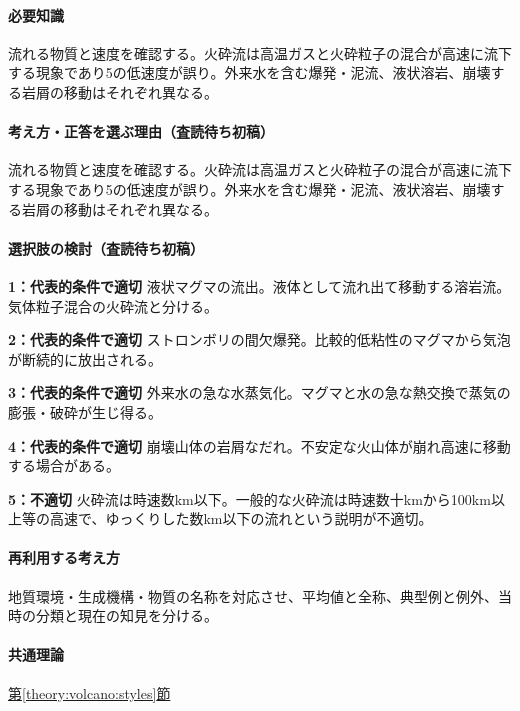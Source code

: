 \paragraph{必要知識} 流れる物質と速度を確認する。火砕流は高温ガスと火砕粒子の混合が高速に流下する現象であり5の低速度が誤り。外来水を含む爆発・泥流、液状溶岩、崩壊する岩屑の移動はそれぞれ異なる。

\paragraph{考え方・正答を選ぶ理由（査読待ち初稿）} 流れる物質と速度を確認する。火砕流は高温ガスと火砕粒子の混合が高速に流下する現象であり5の低速度が誤り。外来水を含む爆発・泥流、液状溶岩、崩壊する岩屑の移動はそれぞれ異なる。

\paragraph{選択肢の検討（査読待ち初稿）}\mbox{}\par

\noindent\textbf{1：代表的条件で適切} 液状マグマの流出。液体として流れ出て移動する溶岩流。気体粒子混合の火砕流と分ける。\par

\noindent\textbf{2：代表的条件で適切} ストロンボリの間欠爆発。比較的低粘性のマグマから気泡が断続的に放出される。\par

\noindent\textbf{3：代表的条件で適切} 外来水の急な水蒸気化。マグマと水の急な熱交換で蒸気の膨張・破砕が生じ得る。\par

\noindent\textbf{4：代表的条件で適切} 崩壊山体の岩屑なだれ。不安定な火山体が崩れ高速に移動する場合がある。\par

\noindent\textbf{5：不適切} 火砕流は時速数km以下。一般的な火砕流は時速数十kmから100km以上等の高速で、ゆっくりした数km以下の流れという説明が不適切。\par

\paragraph{再利用する考え方} 地質環境・生成機構・物質の名称を対応させ、平均値と全称、典型例と例外、当時の分類と現在の知見を分ける。

\paragraph{共通理論} \hyperref[theory:volcano:styles]{第\ref*{theory:volcano:styles}節}

